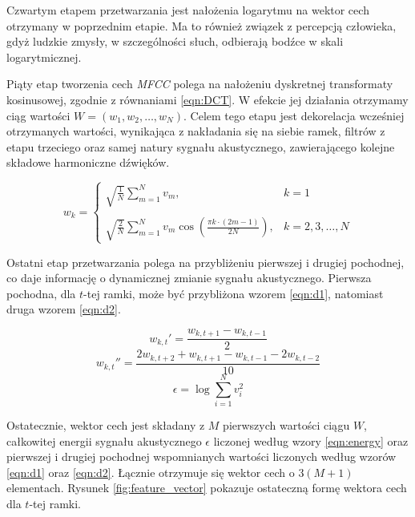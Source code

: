 \documentclass[11pt]{article}
\begin{document}
	 Czwartym etapem przetwarzania jest nałożenia logarytmu na wektor cech otrzymany w poprzednim etapie. Ma to również związek z percepcją człowieka, gdyż ludzkie zmysły, w szczególności słuch, odbierają bodźce w skali logarytmicznej. 
	 
	 Piąty etap tworzenia cech \textit{MFCC} polega na nałożeniu dyskretnej transformaty kosinusowej, zgodnie z równaniami \ref{eqn:DCT}. W efekcie jej działania otrzymamy ciąg wartości $W=(w_1, w_2, \ldots, w_N)$. Celem tego etapu jest dekorelacja wcześniej otrzymanych wartości, wynikająca z nakładania się na siebie ramek, filtrów z etapu trzeciego oraz samej natury sygnału akustycznego, zawierającego kolejne składowe harmoniczne dźwięków.
	 
	 \begin{equation}
		w_k = 
		\begin{cases}
			\sqrt{\frac{1}{N}}\sum_{m=1}^{N}v_m, & k = 1 \\
			&\\
			\sqrt{\frac{2}{N}}\sum_{m=1}^{N}{v_m \cos(\frac{\pi k \cdot (2m - 1)}{2N})}, & k = 2,3,\ldots,N
		\end{cases}
		\label{eqn:DCT}
	 \end{equation}
	 
	 Ostatni etap przetwarzania polega na przybliżeniu pierwszej i drugiej pochodnej, co daje informację o dynamicznej zmianie sygnału akustycznego. Pierwsza pochodna, dla $t$-tej ramki, może być przybliżona wzorem \ref{eqn:d1}, natomiast druga wzorem \ref{eqn:d2}.
	 
	 \begin{equation}
	 	 w_{k,t}'=\frac{w_{k,t+1}-w_{k,t-1}}{2}
	 	 \label{eqn:d1}
	 \end{equation}
	 \begin{equation}
		 w_{k,t}''=\frac{2w_{k,t+2}+w_{k,t+1}-w_{k,t-1}-2w_{k,t-2}}{10}
		 \label{eqn:d2}
	 \end{equation}
	 \begin{equation}
	 	\epsilon = \log \sum_{i=1}^N {v_i^2}
	 	\label{eqn:energy}
	 \end{equation}
	 
	 Ostatecznie, wektor cech jest składany z $M$ pierwszych wartości ciągu $W$, całkowitej energii sygnału akustycznego $\epsilon$ liczonej według wzory \ref{eqn:energy} oraz pierwszej i drugiej pochodnej wspomnianych wartości liczonych według wzorów \ref{eqn:d1} oraz \ref{eqn:d2}. Łącznie otrzymuje się wektor cech o $3(M+1)$ elementach. Rysunek \ref{fig:feature_vector} pokazuje ostateczną formę wektora cech dla $t$-tej ramki.
	 
\end{document}
